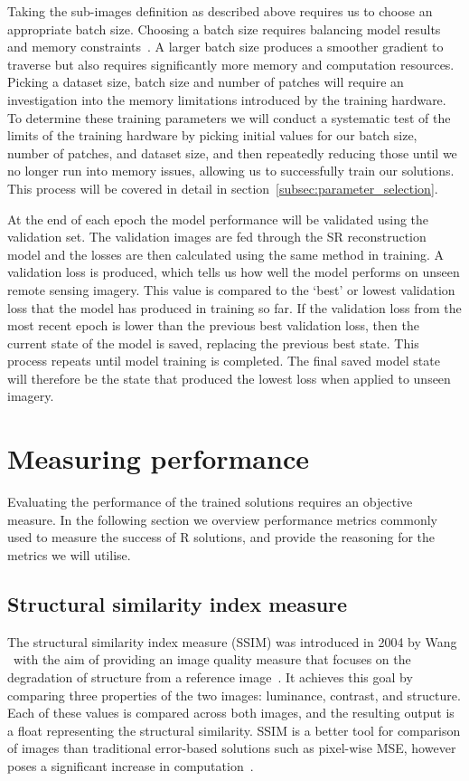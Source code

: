 Taking the sub-images definition as described above requires us to choose an appropriate batch size. Choosing a batch size requires balancing model results and memory constraints~\cite{batchSizeTest}. A larger batch size produces a smoother gradient to traverse but also requires significantly more memory and computation resources. Picking a dataset size, batch size and number of patches will require an investigation into the memory limitations introduced by the training hardware. To determine these training parameters we will conduct a systematic test of the limits of the training hardware by picking initial values for our batch size, number of patches, and dataset size, and then repeatedly reducing those until we no longer run into memory issues, allowing us to successfully train our solutions. This process will be covered in detail in section~\ref{subsec:parameter_selection}.

At the end of each epoch the model performance will be validated using the validation set. The validation images are fed through the SR reconstruction model and the losses are then calculated using the same method in training. A validation loss is produced, which tells us how well the model performs on unseen remote sensing imagery. This value is compared to the `best' or lowest validation loss that the model has produced in training so far. If the validation loss from the most recent epoch is lower than the previous best validation loss, then the current state of the model is saved, replacing the previous best state. This process repeats until model training is completed. The final saved model state will therefore be the state that produced the lowest loss when applied to unseen imagery.

\section{Measuring performance}\label{sec:measuring_performance}
Evaluating the performance of the trained solutions requires an objective measure. In the following section we overview performance metrics commonly used to measure the success of R solutions, and provide the reasoning for the metrics we will utilise.

\subsection{Structural similarity index measure}
The structural similarity index measure (SSIM) was introduced in 2004 by Wang \etal\ with the aim of providing an image quality measure that focuses on the degradation of structure from a reference image~\cite{ssim}. It achieves this goal by comparing three properties of the two images: luminance, contrast, and structure. Each of these values is compared across both images, and the resulting output is a float representing the structural similarity. SSIM is a better tool for comparison of images than traditional error-based solutions such as pixel-wise MSE, however poses a significant increase in computation~\cite{ssim}.

